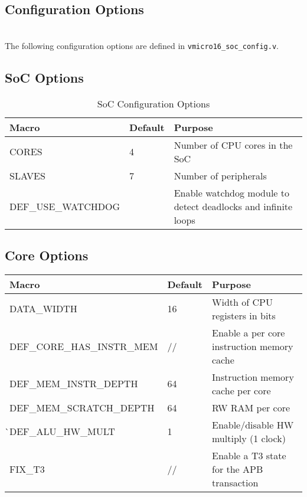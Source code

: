 \begin{appendices}
\startcontents[chapters]

\chapter{Configuration Options}
\startcontents[chapters]

\noindent\\
The following configuration options are defined in \verb|vmicro16_soc_config.v|.

\section{SoC Options}
\begin{table}[H]
\centering
\label{tab:isa}
\begin{tabularx}{\textwidth}{l|l|p{8cm}}
Macro      & Default & Purpose                         \\ 
\hline
CORES  & 4       & Number of CPU cores in the SoC  \\
SLAVES & 7       & Number of peripherals  \\    
DEF\_USE\_WATCHDOG &  & Enable watchdog module to detect deadlocks and infinite loops \\    
\end{tabularx}
\caption{SoC Configuration Options}
\end{table}

\section{Core Options}
\begin{table}[H]
\centering
\begin{tabular}{l|l|p{8cm}}
Macro                      & Default & Purpose                                     \\ 
\hline
DATA\_WIDTH                & 16      & Width of CPU registers in bits              \\
DEF\_CORE\_HAS\_INSTR\_MEM & //      & Enable a per core instruction memory cache  \\
DEF\_MEM\_INSTR\_DEPTH     & 64      & Instruction memory cache per core           \\
DEF\_MEM\_SCRATCH\_DEPTH   & 64      & RW RAM per core                             \\
̀DEF\_ALU\_HW\_MULT        & 1       & Enable/disable HW multiply (1 clock)        \\
FIX\_T3                    & //      & Enable a T3 state for the APB transaction \\


\end{tabular}
\end{table}
\end{appendices}
